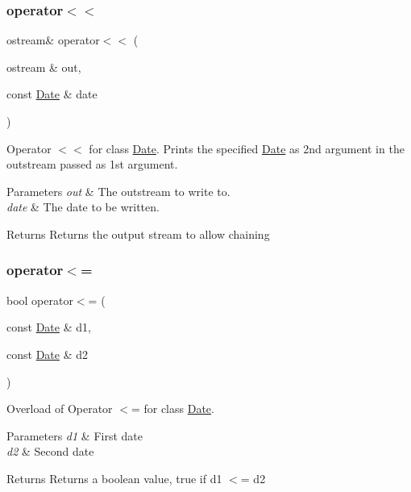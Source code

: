 \subsubsection{\texorpdfstring{operator$<$$<$}{operator<<}}
{\footnotesize\ttfamily ostream\& operator$<$$<$ (\begin{DoxyParamCaption}\item[{ostream \&}]{out,  }\item[{const \hyperlink{class_date}{Date} \&}]{date }\end{DoxyParamCaption})\hspace{0.3cm}{\ttfamily [friend]}}

Operator $<$$<$ for class \hyperlink{class_date}{Date}. Prints the specified \hyperlink{class_date}{Date} as 2nd argument in the outstream passed as 1st argument. 
\begin{DoxyParams}{Parameters}
{\em out} & The outstream to write to. \\
\hline
{\em date} & The date to be written. \\
\hline
\end{DoxyParams}
\begin{DoxyReturn}{Returns}
Returns the output stream to allow chaining 
\end{DoxyReturn}
\hypertarget{class_date_a4f314b2216e8760eac284385a7eaae12}{}\label{class_date_a4f314b2216e8760eac284385a7eaae12} 
\subsubsection{\texorpdfstring{operator$<$=}{operator<=}}
{\footnotesize\ttfamily bool operator$<$= (\begin{DoxyParamCaption}\item[{const \hyperlink{class_date}{Date} \&}]{d1,  }\item[{const \hyperlink{class_date}{Date} \&}]{d2 }\end{DoxyParamCaption})\hspace{0.3cm}{\ttfamily [friend]}}

Overload of Operator $<$= for class \hyperlink{class_date}{Date}. 
\begin{DoxyParams}{Parameters}
{\em d1} & First date \\
\hline
{\em d2} & Second date \\
\hline
\end{DoxyParams}
\begin{DoxyReturn}{Returns}
Returns a boolean value, true if d1 $<$= d2 
\end{DoxyReturn}
\hypertarget{class_date_a18dc8aca1ca4d8cadc2b464db984135b}{}\label{class_date_a18dc8aca1ca4d8cadc2b464db984135b} 
